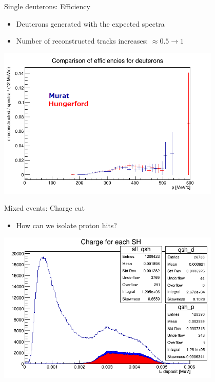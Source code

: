 \documentclass[10pt]{beamer}
\begin{document}
%
\begin{frame}{Single deuterons: Efficiency}
\begin{itemize}
\item Deuterons generated with the expected spectra
\item Number of reconstructed tracks increases: $\approx 0.5\rightarrow 1$ \textperthousand
\end{itemize}
\begin{center}
\includegraphics[width=0.8\textwidth]{plots/ejected/deuterons_eff_comparison_PS}
\end{center}
\end{frame}

%
\begin{frame}{Mixed events: Charge cut}
\begin{itemize}
\item How can we isolate proton hits?
\end{itemize}
\begin{center}
\includegraphics[width=0.8\textwidth]{plots/mix/mix500_qsh_Ps}
\end{center}
\end{frame}
\end{document}
